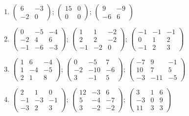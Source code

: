 \begin{enumerate}[label=\arabic*., leftmargin=*, itemsep=1pt]
\item $\left(\begin{smallmatrix}6 & -3\\ -2 & 0\end{smallmatrix}\right)$; $\left(\begin{smallmatrix}15 & 0\\ 0 & 0\end{smallmatrix}\right)$; $\left(\begin{smallmatrix}9 & -9\\ -6 & 6\end{smallmatrix}\right)$
\item $\left(\begin{smallmatrix}0 & -5 & -4\\ -2 & 4 & 6\\ -1 & -6 & -3\end{smallmatrix}\right)$; $\left(\begin{smallmatrix}1 & 1 & -2\\ 2 & 2 & -2\\ -1 & -2 & 0\end{smallmatrix}\right)$; $\left(\begin{smallmatrix}-1 & -1 & -1\\ 0 & 1 & 2\\ -1 & 2 & 3\end{smallmatrix}\right)$
\item $\left(\begin{smallmatrix}1 & 6 & -4\\ 1 & -4 & -5\\ 2 & 1 & 8\end{smallmatrix}\right)$; $\left(\begin{smallmatrix}0 & -5 & 7\\ -2 & -10 & -6\\ 3 & -1 & 5\end{smallmatrix}\right)$; $\left(\begin{smallmatrix}-7 & 9 & -1\\ 10 & 7 & 5\\ -3 & -11 & -5\end{smallmatrix}\right)$
\item $\left(\begin{smallmatrix}2 & 1 & 0\\ -1 & -3 & -1\\ -3 & 2 & 3\end{smallmatrix}\right)$; $\left(\begin{smallmatrix}12 & -3 & 6\\ 5 & -4 & -7\\ 3 & -2 & -2\end{smallmatrix}\right)$; $\left(\begin{smallmatrix}3 & 1 & 6\\ -3 & 0 & 9\\ 11 & 3 & 3\end{smallmatrix}\right)$

\end{enumerate}
